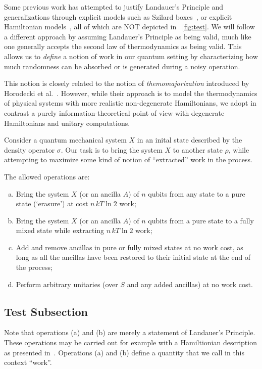 \documentclass[11pt,a4paper]{article}
\begin{document}
Some previous work has attempted to justify Landauer's Principle and generalizations
through explicit models such as Szilard
boxes~\cite{Szilard1929ZeitschriftFuerPhysik,Dahlsten2011NJP_inadequacy}, or explicit
Hamiltonian models~\cite{Alicki2004_hamiltonian}, all of which are NOT depicted in
\figurename~\ref{fig:test}. We will follow a different approach by assuming Landauer's
Principle as being valid, much like one generally accepts the second law of thermodynamics
as being valid. This allows us to {\em define} a notion of work in our quantum setting by
characterizing how much randomness can be absorbed or is generated during a noisy
operation.

This notion is closely related to the notion of {\em themomajorization} introduced by
Horodecki et al.~\cite{Horodecki2013_ThermoMaj}. However, while their approach is to model
the thermodynamics of physical systems with more realistic non-degenerate Hamiltonians, we
adopt in contrast a purely information-theoretical point of view with degenerate
Hamiltonians and unitary computations.

Consider a quantum mechanical system $X$ in an inital state described by the density operator $\sigma$.
Our task is to bring the system $X$ to another state $\rho$, while attempting to maximize some kind of notion
of ``extracted'' work in the process.

The allowed operations are:
\begin{enumerate}[(a)]
\item Bring the system $X$ (or an ancilla $A$) of $n$ qubits from any state to a pure state (`erasure') at
  cost $n\,kT\ln 2$ work;
\item Bring the system $X$ (or an ancilla $A$) of $n$ qubits from a pure state to a fully mixed state while
  extracting $n\,kT\ln 2$ work;
\item Add and remove ancillas in pure or fully mixed states at no work cost, as long as all the ancillas have
  been restored to their initial state at the end of the process;
\item Perform arbitrary unitaries (over $S$ and any added ancillas) at no work cost.
\end{enumerate}

\subsection{Test Subsection}

Note that operations (a) and (b) are merely a statement of Landauer's Principle. These operations
may be carried out for example with a Hamiltionian description as presented in~\cite{delRio2011Nature}.
Operations (a) and (b) define a quantity that we call in this context ``work''.
\end{document}
